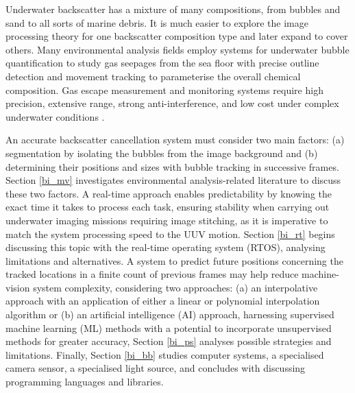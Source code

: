 Underwater backscatter has a mixture of many compositions, from bubbles and sand to all sorts of marine debris. It is much easier to explore the image processing theory for one backscatter composition type and later expand to cover others. Many environmental analysis fields employ systems for underwater bubble quantification to study gas seepages from the sea floor with precise outline detection and movement tracking to parameterise the overall chemical composition. Gas escape measurement and monitoring systems require high precision, extensive range, strong anti-interference, and low cost under complex underwater conditions \cite{zhangUnderwaterBubbleEscape2023}.

An accurate backscatter cancellation system must consider two main factors: (a) segmentation by isolating the bubbles from the image background and (b) determining their positions and sizes with bubble tracking in successive frames. Section \ref{bi_mv} investigates environmental analysis-related literature to discuss these two factors. A real-time approach enables predictability by knowing the exact time it takes to process each task, ensuring stability when carrying out underwater imaging missions requiring image stitching, as it is imperative to match the system processing speed to the UUV motion. Section \ref{bi_rt} begins discussing this topic with the real-time operating system (RTOS), analysing limitations and alternatives. A system to predict future positions concerning the tracked locations in a finite count of previous frames may help reduce machine-vision system complexity, considering two approaches: (a) an interpolative approach with an application of either a linear or polynomial interpolation algorithm or (b) an artificial intelligence (AI) approach, harnessing supervised machine learning (ML) methods with a potential to incorporate unsupervised methods for greater accuracy, Section \ref{bi_ps} analyses possible strategies and limitations. Finally, Section \ref{bi_bb} studies computer systems, a specialised camera sensor, a specialised light source, and concludes with discussing programming languages and libraries.

